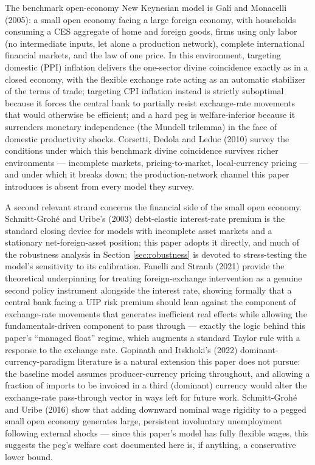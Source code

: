 \documentclass[12pt]{article}
\begin{document}
The benchmark open-economy New Keynesian model is Gal\'i and Monacelli (2005): a small open economy
facing a large foreign economy, with households consuming a CES aggregate of home and foreign goods,
firms using only labor (no intermediate inputs, let alone a production network), complete
international financial markets, and the law of one price. In this environment, targeting domestic
(PPI) inflation delivers the one-sector divine coincidence exactly as in a closed economy, with the
flexible exchange rate acting as an automatic stabilizer of the terms of trade; targeting CPI
inflation instead is strictly suboptimal because it forces the central bank to partially resist
exchange-rate movements that would otherwise be efficient; and a hard peg is welfare-inferior because
it surrenders monetary independence (the Mundell trilemma) in the face of domestic productivity
shocks. Corsetti, Dedola and Leduc (2010) survey the conditions under which this benchmark divine
coincidence survives richer environments --- incomplete markets, pricing-to-market, local-currency
pricing --- and under which it breaks down; the production-network channel this paper introduces is
absent from every model they survey.

A second relevant strand concerns the financial side of the small open economy. Schmitt-Grohé and
Uribe's (2003) debt-elastic interest-rate premium is the standard closing device for models with
incomplete asset markets and a stationary net-foreign-asset position; this paper adopts it directly,
and much of the robustness analysis in Section \ref{sec:robustness} is devoted to stress-testing the
model's sensitivity to its calibration. Fanelli and Straub (2021) provide the theoretical
underpinning for treating foreign-exchange intervention as a genuine second policy instrument
alongside the interest rate, showing formally that a central bank facing a UIP risk premium should
lean against the component of exchange-rate movements that generates inefficient real effects while
allowing the fundamentals-driven component to pass through --- exactly the logic behind this paper's
``managed float'' regime, which augments a standard Taylor rule with a response to the exchange rate.
Gopinath and Itskhoki's (2022) dominant-currency-paradigm literature is a natural extension this paper
does not pursue: the baseline model assumes producer-currency pricing throughout, and allowing a
fraction of imports to be invoiced in a third (dominant) currency would alter the exchange-rate
pass-through vector in ways left for future work. Schmitt-Grohé and Uribe (2016) show that adding
downward nominal wage rigidity to a pegged small open economy generates large, persistent involuntary
unemployment following external shocks --- since this paper's model has fully flexible wages, this
suggests the peg's welfare cost documented here is, if anything, a conservative lower bound.
\end{document}
